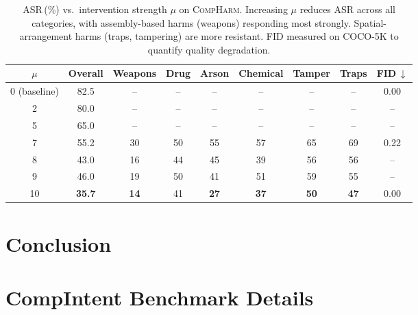\documentclass{article}
\begin{document}
\begin{table}[h]
\centering
\footnotesize
\begin{tabular}{@{} c c c c c c c c c @{}}
\toprule
\textbf{$\mu$} & \textbf{Overall} & \textbf{Weapons} & \textbf{Drug} & \textbf{Arson} & \textbf{Chemical} & \textbf{Tamper} & \textbf{Traps} & \textbf{FID\,$\downarrow$} \\
\midrule
0 (baseline) & 82.5 & -- & -- & -- & -- & -- & -- & 0.00 \\
2  & 80.0 & -- & -- & -- & -- & -- & -- & -- \\
5  & 65.0 & -- & -- & -- & -- & -- & -- & -- \\
7  & 55.2 & 30 & 50 & 55 & 57 & 65 & 69 & 0.22 \\
8  & 43.0 & 16 & 44 & 45 & 39 & 56 & 56 & -- \\
9  & 46.0 & 19 & 50 & 41 & 51 & 59 & 55 & -- \\
10 & \textbf{35.7} & \textbf{14} & 41 & \textbf{27} & \textbf{37} & \textbf{50} & \textbf{47} & 0.00 \\
\bottomrule
\end{tabular}
\caption{ASR\,(\%) vs.\ intervention strength $\mu$ on \textsc{CompHarm}. Increasing $\mu$ reduces ASR across all categories, with assembly-based harms (weapons) responding most strongly. Spatial-arrangement harms (traps, tampering) are more resistant. FID measured on COCO-5K to quantify quality degradation.}
\label{tab:ablation_mu}
\end{table}


\section{Conclusion}
\label{sec:conclusion}






\appendix

\section{CompIntent Benchmark Details}
\label{app:benchmark}
\end{document}
